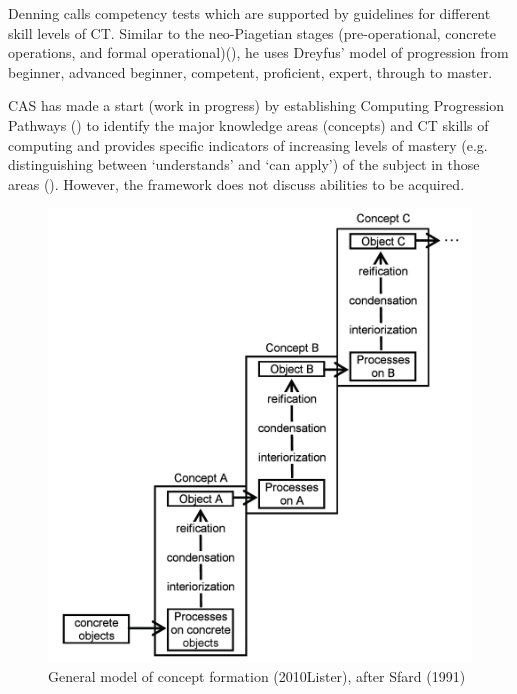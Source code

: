 Denning \cite{denning2017remaining} calls competency tests which are supported by guidelines for different skill levels of CT. Similar to the neo-Piagetian stages (pre-operational, concrete operations, and formal operational)(\cite{szabo2014neo}), he uses Dreyfus' model of progression from beginner, advanced beginner, competent, proficient, expert, through to master.

CAS has made a start (work in progress) by establishing Computing Progression Pathways (\cite{Dorling2014CTprogressions}) to identify the major knowledge areas (concepts) and CT skills of computing and provides specific indicators of increasing levels of mastery (e.g. distinguishing between ‘understands’ and ‘can apply’) of the subject in those areas (\cite{Giordano2015}). However, the framework does not discuss abilities to be acquired\cite{denning2017remaining}.



 

\begin{figure}
\includegraphics[scale=0.8]{figures/ListerFases.png}
\caption{General model of concept formation (2010Lister), after Sfard (1991)}\label{fig:ListerFases}
\end{figure}

